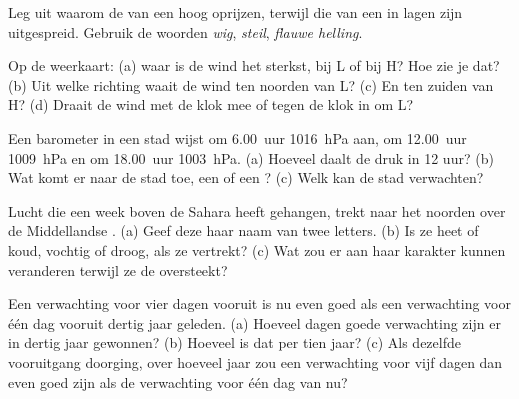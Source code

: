 \begin{exercise}[$\star\star$]\label{exo:g8:fronts-and-weather-maps:6}
Leg uit waarom de  van een  hoog oprijzen, terwijl die van
een  in lagen zijn uitgespreid. Gebruik de woorden \emph{wig},
\emph{steil}, \emph{flauwe helling}.
\end{exercise}

\begin{exercise}[$\star\star$]\label{exo:g8:fronts-and-weather-maps:7}
Op de weerkaart: (a) waar is de wind het sterkst, bij L of bij H? Hoe zie
je dat? (b) Uit welke richting waait de wind ten noorden van L? (c) En ten
zuiden van H? (d) Draait de wind met de klok mee of tegen de klok in om L?
\end{exercise}

\begin{exercise}[$\star\star$]\label{exo:g8:fronts-and-weather-maps:8}
Een barometer in een stad wijst om 6.00~uur \qty{1016}{hPa} aan, om
12.00~uur \qty{1009}{hPa} en om 18.00~uur \qty{1003}{hPa}. (a) Hoeveel
daalt de druk in 12 uur? (b) Wat komt er naar de stad toe, een  of
een ? (c) Welk  kan de stad verwachten?
\end{exercise}

\begin{exercise}[$\star\star$]\label{exo:g8:fronts-and-weather-maps:9}
Lucht die een week boven de Sahara heeft gehangen, trekt naar het noorden
over de Middellandse . (a) Geef deze  haar naam van twee
letters. (b) Is ze heet of koud, vochtig of droog, als ze vertrekt?
(c) Wat zou er aan haar karakter kunnen veranderen terwijl ze de 
oversteekt?
\end{exercise}

\begin{exercise}[$\star\star$]\label{exo:g8:fronts-and-weather-maps:10}
Een verwachting voor vier dagen vooruit is nu even goed als een
verwachting voor één dag vooruit dertig jaar geleden. (a) Hoeveel dagen
goede verwachting zijn er in dertig jaar gewonnen? (b) Hoeveel is dat per
tien jaar? (c) Als dezelfde vooruitgang doorging, over hoeveel jaar zou een
verwachting voor vijf dagen dan even goed zijn als de verwachting voor één
dag van nu?
\end{exercise}

